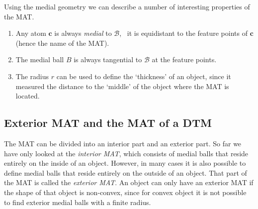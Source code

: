 Using the medial geometry we can describe a number of interesting properties of the MAT\@.
\begin{enumerate}
	\item Any atom $\mathbf{c}$ is always \emph{medial} to $\mathcal{B}$, \ie\ it is equidistant to the feature points of $\mathbf{c}$ (hence the name of the MAT).
	\item The medial ball $B$ is always tangential to $\mathcal{B}$ at the feature points. 
	\item The radius $r$ can be used to define the `thickness' of an object, since it measured the distance to the `middle' of the object where the MAT is located.
\end{enumerate}

\subsection{Exterior MAT and the MAT of a DTM}
The MAT can be divided into an interior part and an exterior part.
So far we have only looked at the \emph{interior MAT}, which consists of medial balls that reside entirely on the inside of an object.
However, in many cases it is also possible to define medial balls that reside entirely on the outside of an object.
That part of the MAT is called the \emph{exterior MAT}.
An object can only have an exterior MAT if the shape of that object is non-convex, since for convex object it is not possible to find exterior medial balls with a finite radius.

